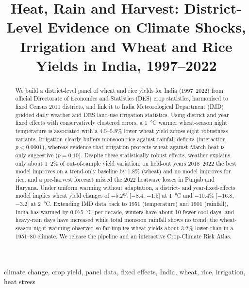 \documentclass[conference]{IEEEtran}
\begin{document}
\title{Heat, Rain and Harvest: District-Level Evidence on Climate Shocks, Irrigation and Wheat and Rice Yields in India, 1997--2022}

\author{
}

\maketitle

\begin{abstract}
We build a district-level panel of wheat and rice yields for India (1997--2022) from official Directorate of Economics
and Statistics (DES) crop statistics, harmonised to fixed Census 2011 districts, and link it to India Meteorological
Department (IMD) gridded daily weather and DES land-use irrigation statistics. Using district and year fixed effects
with conservatively clustered errors, a \SI{1}{\degreeCelsius} warmer wheat-season night temperature is associated with a
4.5--5.8\% lower wheat yield across eight robustness variants. Irrigation clearly buffers monsoon rice against rainfall
deficits (interaction $p<0.0001$), whereas evidence that irrigation protects wheat against March heat is only suggestive
($p=0.10$). Despite these statistically robust effects, weather explains only about 1--2\% of out-of-sample yield
variation: on held-out years 2018--2022 the best model improves on a trend-only baseline by 1.8\% (wheat) and no model
improves for rice, and a pre-harvest forecast missed the 2022 heatwave losses in Punjab and Haryana. Under uniform
warming without adaptation, a district- and year-fixed-effects model implies wheat yield changes of $-5.2\%$ [$-8.4$, $-1.5$] at
\SI{+1}{\degreeCelsius} and $-10.4\%$ [$-16.8$, $-3.2$] at \SI{+2}{\degreeCelsius}. Extending IMD data back to 1951
(temperature) and 1901 (rainfall), India has warmed by \SI{0.075}{\degreeCelsius} per decade, winters have about 10
fewer cool days, and heavy-rain days have increased while total monsoon rainfall shows no trend; the wheat-season night
warming observed so far implies wheat yields about 3.2\% lower than in a 1951--80 climate. We release the pipeline and an
interactive Crop-Climate Risk Atlas.
\end{abstract}

\begin{IEEEkeywords}
climate change, crop yield, panel data, fixed effects, India, wheat, rice, irrigation, heat stress
\end{IEEEkeywords}
\end{document}
